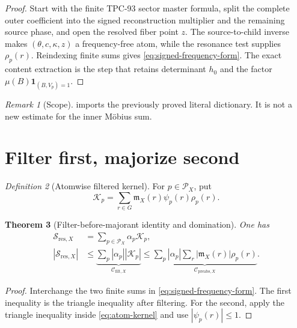 \documentclass[11pt]{article}
\newtheorem{theorem}{Theorem}[section]
\theoremstyle{remark}
\newtheorem{remark}[theorem]{Remark}
\newtheorem{definition}[theorem]{Definition}
\newcommand{\one}{\mathbf 1}
\begin{document}
\begin{proof}
Start with the finite TPC-93 sector master formula, split the
complete outer coefficient into the signed reconstruction
multiplier and the remaining source phase, and open the resolved
fiber point \(z\).  The source-to-child inverse makes
\((\theta,c,\kappa,z)\) a frequency-free atom, while the resonance
test supplies \(\rho_p(r)\).  Reindexing finite sums gives
\eqref{eq:signed-frequency-form}.  The exact content extraction is
the step that retains determinant \(h_0\) and the factor
\(\mu(B)\one_{(B,V_p)=1}\).
\end{proof}

\begin{remark}[Scope]
 imports the previously proved
literal dictionary.  It is not a new estimate for the inner
M\"obius sum.
\end{remark}

\section{Filter first, majorize second}

\begin{definition}[Atomwise filtered kernel]
\label{def:atom-kernel}
For \(p\in\mathcal P_X\), put
\begin{equation}
 \mathcal K_p
 =
 \sum_{r\in G}
 \mathfrak m_X(r)\psi_p(r)\rho_p(r).
\label{eq:atom-kernel}
\end{equation}
\end{definition}

\begin{theorem}[Filter-before-majorant identity and domination]
\label{thm:filter-first}
One has
\begin{align}
 \mathcal S_{\mathrm{res},X}
 &=
 \sum_{p\in\mathcal P_X}\alpha_p\mathcal K_p,
\label{eq:filter-first-identity}\\
 |\mathcal S_{\mathrm{res},X}|
 &\le
 \underbrace{\sum_p|\alpha_p||\mathcal K_p|}
 _{\mathcal C_{\mathrm{filt},X}}
 \le
 \underbrace{\sum_p|\alpha_p|
 \sum_r|\mathfrak m_X(r)|\rho_p(r)}
 _{\mathcal C_{\mathrm{preabs},X}}.
\label{eq:majorant-chain}
\end{align}
\end{theorem}

\begin{proof}
Interchange the two finite sums in
\eqref{eq:signed-frequency-form}.  The first inequality is the
triangle inequality after filtering.  For the second, apply the
triangle inequality inside \eqref{eq:atom-kernel} and use
\(|\psi_p(r)|\le1\).
\end{proof}
\end{document}
